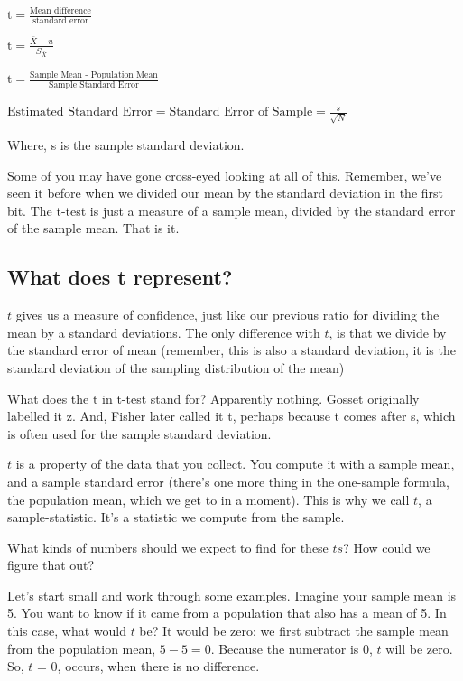\documentclass[
]{book}
\begin{document}
\(\text{t} = \frac{\text{Mean difference}}{\text{standard error}}\)

\(\text{t} = \frac{\bar{X}-u}{S_{\bar{X}}}\)

\(\text{t} = \frac{\text{Sample Mean  - Population Mean}}{\text{Sample Standard Error}}\)

\(\text{Estimated Standard Error} = \text{Standard Error of Sample} = \frac{s}{\sqrt{N}}\)

Where, s is the sample standard deviation.

Some of you may have gone cross-eyed looking at all of this. Remember, we've seen it before when we divided our mean by the standard deviation in the first bit. The t-test is just a measure of a sample mean, divided by the standard error of the sample mean. That is it.

\hypertarget{what-does-t-represent}{%
\subsection{What does t represent?}\label{what-does-t-represent}}

\(t\) gives us a measure of confidence, just like our previous ratio for dividing the mean by a standard deviations. The only difference with \(t\), is that we divide by the standard error of mean (remember, this is also a standard deviation, it is the standard deviation of the sampling distribution of the mean)

\begin{marginnote}

What does the t in t-test stand for? Apparently nothing. Gosset originally labelled it z. And, Fisher later called it t, perhaps because t comes after s, which is often used for the sample standard deviation.

\end{marginnote}

\(t\) is a property of the data that you collect. You compute it with a sample mean, and a sample standard error (there's one more thing in the one-sample formula, the population mean, which we get to in a moment). This is why we call \(t\), a sample-statistic. It's a statistic we compute from the sample.

What kinds of numbers should we expect to find for these \(ts\)? How could we figure that out?

Let's start small and work through some examples. Imagine your sample mean is 5. You want to know if it came from a population that also has a mean of 5. In this case, what would \(t\) be? It would be zero: we first subtract the sample mean from the population mean, \(5-5=0\). Because the numerator is 0, \(t\) will be zero. So, \(t\) = 0, occurs, when there is no difference.
\end{document}
